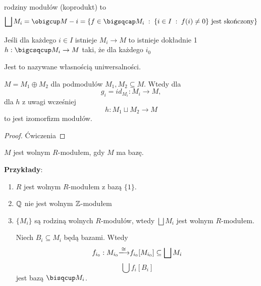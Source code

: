 \begin{bbox}
 rodziny modułów (koprodukt) to
$$\bigsqcup M_i=\obigcup M-i=\{f\in\bigsqcap M_i\;:\;\{i\in I\;:\;f(i)\neq 0\}\text{ jest skończony}\}$$
\end{bbox}

\begin{remark}
Jeśli dla każdego $i\in I$ istnieje $M_i\to M$ to istnieje dokładnie 1 $h:\bigcsqcup M_i\to M$ taki, że dla każdego $i_0$

\begin{center}\end{center}

Jest to nazywane własnością uniwersalności.
\end{remark}

\begin{remark}
$M=M_1\oplus M_2$ dla podmodułów $M_1,M_2\subseteq M$. Wtedy dla 
$$g_i=id_{M_i}:M_i\to M,$$ 
dla $h$ z uwagi wcześniej
$$h:M_1\sqcup M_2\to M$$
to jest izomorfizm modułów.
\end{remark}
\begin{proof}
Ćwiczenia
\end{proof}

\begin{definition}
$M$ jest wolnym $R$-modułem, gdy $M$ ma bazę.
\end{definition}

\textbf{Przykłady}:

\begin{enumerate}
    \item $R$ jest wolnym $R$-modułem z bazą $\{1\}$. 
    \item $\mathbb{Q}$ nie jest wolnym $\mathbb{Z}$-modułem
    \item $\{M_i\}$ są rodziną wolnych $R$-modułów, wtedy $\bigsqcup M_i$ jest wolnym $R$-modułem.

    Niech $B_i\subseteq M_i$ będą bazami. Wtedy 
    $$f_{i_0}:M_{i_0}\isomorphism f_{i_0}[M_{i_0}]\subseteq\bigsqcup M_i$$
    $$\bigcup f_i[B_i]$$
    jest bazą $\bisqcup M_i$.
\end{enumerate}
